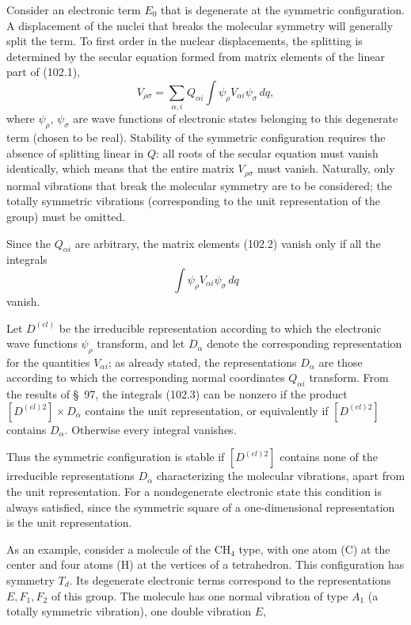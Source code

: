 
Consider an electronic term $E_0$ that is degenerate at the symmetric configuration. A displacement of the nuclei that breaks the molecular symmetry will generally split the term. To first order in the nuclear displacements, the splitting is determined by the secular equation formed from matrix elements of the linear part of (102.1),
\begin{equation}
 V_{\rho\sigma}=\sum_{\alpha,i}Q_{\alpha i}\int\psi_\rho V_{\alpha i}\psi_\sigma\,dq,
 \tag{102.2}
\end{equation}
where $\psi_\rho$, $\psi_\sigma$ are wave functions of electronic states belonging to this degenerate term (chosen to be real). Stability of the symmetric configuration requires the absence of splitting linear in $Q$: all roots of the secular equation must vanish identically, which means that the entire matrix $V_{\rho\sigma}$ must vanish. Naturally, only normal vibrations that break the molecular symmetry are to be considered; the totally symmetric vibrations (corresponding to the unit representation of the group) must be omitted.

Since the $Q_{\alpha i}$ are arbitrary, the matrix elements (102.2) vanish only if all the integrals
\begin{equation}
 \int\psi_\rho V_{\alpha i}\psi_\sigma\,dq
 \tag{102.3}
\end{equation}
vanish.

Let $D^{(el)}$ be the irreducible representation according to which the electronic wave functions $\psi_\rho$ transform, and let $D_\alpha$ denote the corresponding representation for the quantities $V_{\alpha i}$; as already stated, the representations $D_\alpha$ are those according to which the corresponding normal coordinates $Q_{\alpha i}$ transform. From the results of \S~97, the integrals (102.3) can be nonzero if the product $[D^{(el)2}]\times D_\alpha$ contains the unit representation, or equivalently if $[D^{(el)2}]$ contains $D_\alpha$. Otherwise every integral vanishes.

Thus the symmetric configuration is stable if $[D^{(el)2}]$ contains none of the irreducible representations $D_\alpha$ characterizing the molecular vibrations, apart from the unit representation. For a nondegenerate electronic state this condition is always satisfied, since the symmetric square of a one-dimensional representation is the unit representation.

As an example, consider a molecule of the $\mathrm{CH}_4$ type, with one atom (C) at the center and four atoms (H) at the vertices of a tetrahedron. This configuration has symmetry $T_d$. Its degenerate electronic terms correspond to the representations $E,F_1,F_2$ of this group. The molecule has one normal vibration of type $A_1$ (a totally symmetric vibration), one double vibration $E$,

